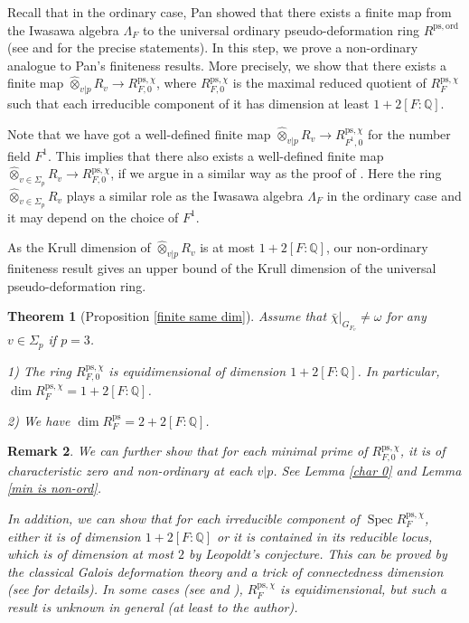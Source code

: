 \documentclass[a4paper, 12pt]{amsart}
\newtheorem{thm}{Theorem}[subsection]
\newtheorem{rem}[thm]{\bf Remark}
\DeclareMathOperator{\Spec}{Spec}
\def\ps{\mathrm{ps}}
\def\ord{\mathrm{ord}}
\newcommand{\Q}{\mathbb{Q}}
\begin{document}
	Recall that in the ordinary case, Pan showed that there exists a finite map from the Iwasawa algebra $\Lambda_F$ to the universal ordinary pseudo-deformation ring $R^{\ps, \ord}$ (see \cite[Theorem 5.1.1]{pan2022fontaine} and \cite[Theorem 6.1.1]{pan2022fontaine} for the precise statements). In this step, we prove a non-ordinary analogue to Pan's finiteness results. More precisely, we show that there exists a finite map $\widehat{\otimes}_{v|p} R_v \to R_{F, 0}^{\ps, \chi}$, where $R_{F, 0}^{\ps, \chi} $ is the maximal reduced quotient of $R_{F}^{\ps, \chi}$ such that each irreducible component of it has dimension at least $1+2[F:\Q]$.  
	
	Note that we have got a well-defined finite map $\widehat{\otimes}_{v|p} R_v \to R_{F^1, 0}^{\ps, \chi} $ for the number field $F^1$. This implies that there also exists a well-defined finite map $\widehat{\otimes}_{v \in \Sigma_p} R_v \to R_{F, 0}^{\ps, \chi} $, if we argue in a similar way as the proof of \cite[Theorem 5.1.1]{pan2022fontaine}. Here the ring $\widehat{\otimes}_{v \in \Sigma_p} R_v$ plays a similar role as the Iwasawa algebra $\Lambda_F$ in the ordinary case and it may depend on the choice of $F^1$.
	
	As the Krull dimension of $\widehat{\otimes}_{v|p} R_v$ is at most $1+2[F:\Q]$, our non-ordinary finiteness result gives an upper bound of the Krull dimension of the universal pseudo-deformation ring.
	
	\begin{thm}[Proposition \ref{finite same dim}]
		Assume that $\bar{\chi}|_{G_{F_v}} \ne \omega$ for any $v \in \Sigma_p$ if $p=3$.
		
		1) The ring $R_{F, 0}^{\ps, \chi}$ is equidimensional of dimension $1+2[F:\Q]$. In particular, $\dim R_{F}^{\ps, \chi} =1+2[F:\Q] $.
		
		2) We have $\dim R_{F}^{\ps} =2+2[F:\Q]$.
	\end{thm}
	
	\begin{rem}
		We can further show that for each minimal prime of $R_{F, 0}^{\ps, \chi}$, it is of characteristic zero and non-ordinary at each $v|p$. See Lemma \ref{char 0} and Lemma \ref{min is non-ord}.
		
		In addition, we can show that for each irreducible component of $\Spec R_{F}^{\ps, \chi} $, either it is of dimension $1+2[F:\Q]$ or it is contained in its reducible locus, which is of dimension at most $2$ by Leopoldt's conjecture. This can be proved by the classical Galois deformation theory and a trick of connectedness dimension (see \cite[Chapter 19]{localcoh} for details). In some cases (see \cite{Deo2022} and \cite{Deo2023}), $R_{F}^{\ps, \chi} $ is equidimensional, but such a result is unknown in general (at least to the author).
	\end{rem}
	
\end{document}
